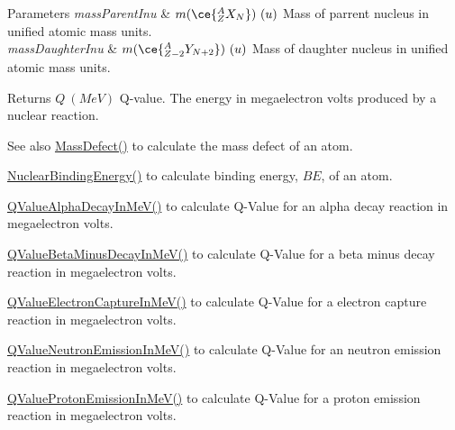 \begin{DoxyParams}{Parameters}
{\em mass\+Parent\+Inu} & $m(\ce{ ^{A}_{Z}X_{N} })\ (u)$ Mass of parrent nucleus in unified atomic mass units. \\
\hline
{\em mass\+Daughter\+Inu} & $m(\ce{ ^{A}_{Z -2}Y_{N +2} })\ (u)$ Mass of daughter nucleus in unified atomic mass units. \\
\hline
\end{DoxyParams}
\begin{DoxyReturn}{Returns}
$Q\ (MeV)$ Q-\/value. The energy in megaelectron volts produced by a nuclear reaction. 
\end{DoxyReturn}
\begin{DoxySeeAlso}{See also}
\mbox{\hyperlink{group___e_g_x_phys-_mass_defect_gae89f2dfa65992c0314adc2440b2f582a}{Mass\+Defect()}} to calculate the mass defect of an atom. 

\mbox{\hyperlink{group___e_g_x_phys-_nuclear_binding_energy_gab6832bf15ead7b4e867e759e0a2a078e}{Nuclear\+Binding\+Energy()}} to calculate binding energy, $BE$, of an atom. 

\mbox{\hyperlink{group___e_g_x_phys-_q_value-_alpha_ga4f9a38d3ad4bf93471a0affb493b6e72}{Q\+Value\+Alpha\+Decay\+In\+Me\+V()}} to calculate Q-\/\+Value for an alpha decay reaction in megaelectron volts. 

\mbox{\hyperlink{group___e_g_x_phys-_q_value-_beta_minus_gaac1374ce9ba39bef416f34298708bda9}{Q\+Value\+Beta\+Minus\+Decay\+In\+Me\+V()}} to calculate Q-\/\+Value for a beta minus decay reaction in megaelectron volts. 

\mbox{\hyperlink{group___e_g_x_phys-_q_value-_electron_capture_ga9cd8502b6101614c17114e9710cdcf6c}{Q\+Value\+Electron\+Capture\+In\+Me\+V()}} to calculate Q-\/\+Value for a electron capture reaction in megaelectron volts. 

\mbox{\hyperlink{group___e_g_x_phys-_q_value-_neutron_emission_ga8ad6e53cb04260eb9b140e22b5b6d9f6}{Q\+Value\+Neutron\+Emission\+In\+Me\+V()}} to calculate Q-\/\+Value for an neutron emission reaction in megaelectron volts. 

\mbox{\hyperlink{group___e_g_x_phys-_q_value-_proton_emission_ga5d92756e945e66bd2ed7d55145b95c3b}{Q\+Value\+Proton\+Emission\+In\+Me\+V()}} to calculate Q-\/\+Value for a proton emission reaction in megaelectron volts. 
\end{DoxySeeAlso}
